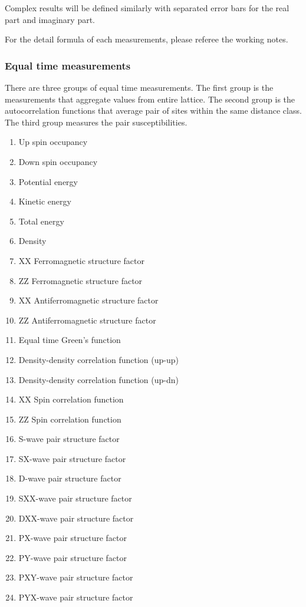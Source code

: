\documentclass[12pt]{article}
\begin{document}
Complex results will be defined similarly with separated error bars for the real part and imaginary part.

For the detail formula of each measurements, please referee the working notes.

\subsubsection{Equal time measurements}
There are three groups of equal time measurements. The first group is the measurements that aggregate values from entire lattice. The second group is the autocorrelation functions that average pair of sites within the same distance class. The third group measures the pair susceptibilities.
\begin{enumerate}
   \item Up spin occupancy
   \item Down spin occupancy
   \item Potential energy
   \item Kinetic energy
   \item Total energy
   \item Density
   \item XX Ferromagnetic structure factor
   \item ZZ Ferromagnetic structure factor
   \item XX Antiferromagnetic structure factor
   \item ZZ Antiferromagnetic structure factor
   \item Equal time Green's function
   \item Density-density correlation function (up-up)
   \item Density-density correlation function (up-dn)
   \item XX Spin correlation function
   \item ZZ Spin correlation function
   \item S-wave pair structure factor
   \item SX-wave pair structure factor
   \item D-wave pair structure factor
   \item SXX-wave pair structure factor
   \item DXX-wave pair structure factor
   \item PX-wave pair structure factor
   \item PY-wave pair structure factor
   \item PXY-wave pair structure factor
   \item PYX-wave pair structure factor
\end{enumerate}
\end{document}
